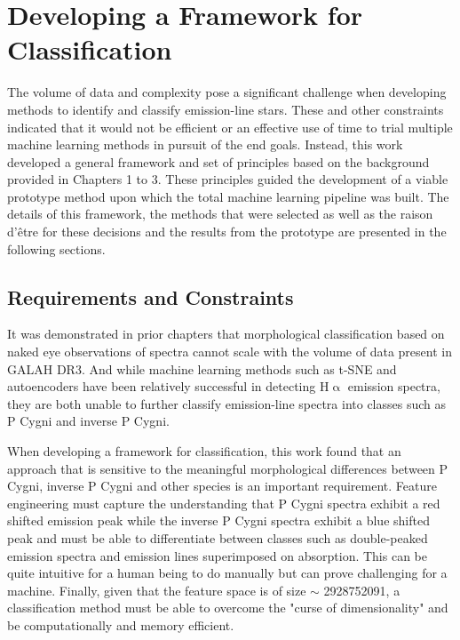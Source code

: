 \chapter{Developing a Framework for Classification}

The volume of data and complexity pose a significant challenge when developing methods to identify and classify emission-line stars. These and other constraints indicated that it would not be efficient or an effective use of time to trial multiple machine learning methods in pursuit of the end goals. Instead, this work developed a general framework and set of principles based on the background provided in Chapters 1 to 3. These principles guided the development of a viable prototype method upon which the total machine learning pipeline was built. The details of this framework, the methods that were selected as well as the raison d'être for these decisions and the results from the prototype are presented in the following sections.

\section{Requirements and Constraints}

It was demonstrated in prior chapters that morphological classification based on naked eye observations of spectra cannot scale with the volume of data present in GALAH DR3. And while machine learning methods such as t-SNE and autoencoders \cite{traven2017galah}\cite{vcotar2021galah} have been relatively successful in detecting H$\upalpha$ emission spectra, they are both unable to further classify emission-line spectra into classes such as P Cygni and inverse P Cygni.

When developing a framework for classification, this work found that an approach that is sensitive to the meaningful morphological differences between P Cygni, inverse P Cygni and other species is an important requirement. Feature engineering must capture the understanding that P Cygni spectra exhibit a red shifted emission peak while the inverse P Cygni spectra exhibit a blue shifted peak and must be able to differentiate between classes such as double-peaked emission spectra and emission lines superimposed on absorption. This can be quite intuitive for a human being to do manually but can prove challenging for a machine. Finally, given that the feature space is of size $\sim$ \num[round-precision=2,round-mode=figures, scientific-notation=true]{2928752091}, a classification method must be able to overcome the "curse of dimensionality" and be computationally and memory efficient.

